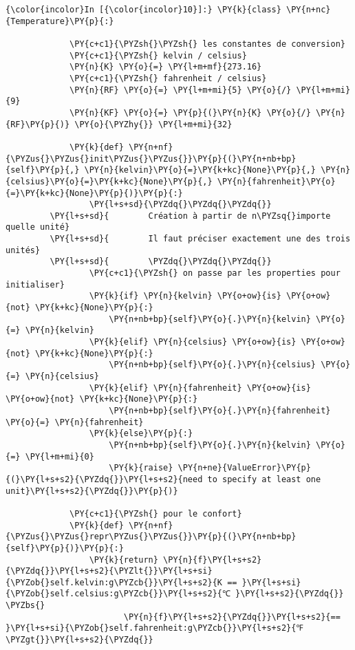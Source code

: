     \begin{Verbatim}[commandchars=\\\{\}]
{\color{incolor}In [{\color{incolor}10}]:} \PY{k}{class} \PY{n+nc}{Temperature}\PY{p}{:}
         
             \PY{c+c1}{\PYZsh{}\PYZsh{} les constantes de conversion}
             \PY{c+c1}{\PYZsh{} kelvin / celsius}
             \PY{n}{K} \PY{o}{=} \PY{l+m+mf}{273.16}
             \PY{c+c1}{\PYZsh{} fahrenheit / celsius}
             \PY{n}{RF} \PY{o}{=} \PY{l+m+mi}{5} \PY{o}{/} \PY{l+m+mi}{9}
             \PY{n}{KF} \PY{o}{=} \PY{p}{(}\PY{n}{K} \PY{o}{/} \PY{n}{RF}\PY{p}{)} \PY{o}{\PYZhy{}} \PY{l+m+mi}{32}
         
             \PY{k}{def} \PY{n+nf}{\PYZus{}\PYZus{}init\PYZus{}\PYZus{}}\PY{p}{(}\PY{n+nb+bp}{self}\PY{p}{,} \PY{n}{kelvin}\PY{o}{=}\PY{k+kc}{None}\PY{p}{,} \PY{n}{celsius}\PY{o}{=}\PY{k+kc}{None}\PY{p}{,} \PY{n}{fahrenheit}\PY{o}{=}\PY{k+kc}{None}\PY{p}{)}\PY{p}{:}
                 \PY{l+s+sd}{\PYZdq{}\PYZdq{}\PYZdq{}}
         \PY{l+s+sd}{        Création à partir de n\PYZsq{}importe quelle unité}
         \PY{l+s+sd}{        Il faut préciser exactement une des trois unités}
         \PY{l+s+sd}{        \PYZdq{}\PYZdq{}\PYZdq{}}
                 \PY{c+c1}{\PYZsh{} on passe par les properties pour initialiser}
                 \PY{k}{if} \PY{n}{kelvin} \PY{o+ow}{is} \PY{o+ow}{not} \PY{k+kc}{None}\PY{p}{:}
                     \PY{n+nb+bp}{self}\PY{o}{.}\PY{n}{kelvin} \PY{o}{=} \PY{n}{kelvin}
                 \PY{k}{elif} \PY{n}{celsius} \PY{o+ow}{is} \PY{o+ow}{not} \PY{k+kc}{None}\PY{p}{:}
                     \PY{n+nb+bp}{self}\PY{o}{.}\PY{n}{celsius} \PY{o}{=} \PY{n}{celsius}
                 \PY{k}{elif} \PY{n}{fahrenheit} \PY{o+ow}{is} \PY{o+ow}{not} \PY{k+kc}{None}\PY{p}{:}
                     \PY{n+nb+bp}{self}\PY{o}{.}\PY{n}{fahrenheit} \PY{o}{=} \PY{n}{fahrenheit}
                 \PY{k}{else}\PY{p}{:}
                     \PY{n+nb+bp}{self}\PY{o}{.}\PY{n}{kelvin} \PY{o}{=} \PY{l+m+mi}{0}
                     \PY{k}{raise} \PY{n+ne}{ValueError}\PY{p}{(}\PY{l+s+s2}{\PYZdq{}}\PY{l+s+s2}{need to specify at least one unit}\PY{l+s+s2}{\PYZdq{}}\PY{p}{)}
         
             \PY{c+c1}{\PYZsh{} pour le confort}
             \PY{k}{def} \PY{n+nf}{\PYZus{}\PYZus{}repr\PYZus{}\PYZus{}}\PY{p}{(}\PY{n+nb+bp}{self}\PY{p}{)}\PY{p}{:}
                 \PY{k}{return} \PY{n}{f}\PY{l+s+s2}{\PYZdq{}}\PY{l+s+s2}{\PYZlt{}}\PY{l+s+si}{\PYZob{}self.kelvin:g\PYZcb{}}\PY{l+s+s2}{K == }\PY{l+s+si}{\PYZob{}self.celsius:g\PYZcb{}}\PY{l+s+s2}{℃ }\PY{l+s+s2}{\PYZdq{}} \PYZbs{}
                        \PY{n}{f}\PY{l+s+s2}{\PYZdq{}}\PY{l+s+s2}{== }\PY{l+s+si}{\PYZob{}self.fahrenheit:g\PYZcb{}}\PY{l+s+s2}{℉\PYZgt{}}\PY{l+s+s2}{\PYZdq{}}
         

\end{Verbatim}
